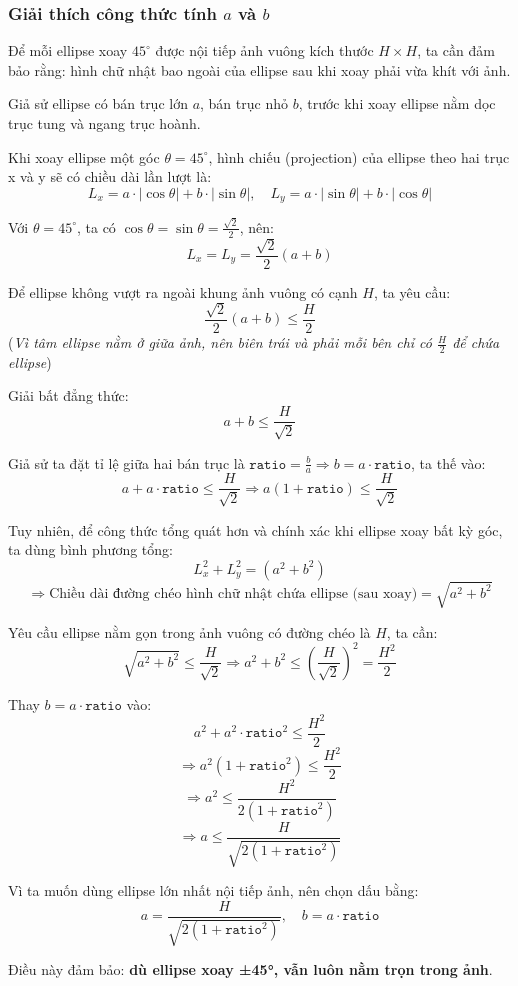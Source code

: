 \subsubsection*{Giải thích công thức tính \( a \) và \( b \)}

Để mỗi ellipse xoay $45^\circ$ được nội tiếp ảnh vuông kích thước $H \times H$, ta cần đảm bảo rằng: hình chữ nhật bao ngoài của ellipse sau khi xoay phải vừa khít với ảnh.

Giả sử ellipse có bán trục lớn \( a \), bán trục nhỏ \( b \), trước khi xoay ellipse nằm dọc trục tung và ngang trục hoành.

Khi xoay ellipse một góc \( \theta = 45^\circ \), hình chiếu (projection) của ellipse theo hai trục x và y sẽ có chiều dài lần lượt là:
\[
  L_x = a \cdot |\cos\theta| + b \cdot |\sin\theta|, \quad
  L_y = a \cdot |\sin\theta| + b \cdot |\cos\theta|
\]

Với \( \theta = 45^\circ \), ta có \( \cos\theta = \sin\theta = \frac{\sqrt{2}}{2} \), nên:
\[
  L_x = L_y = \frac{\sqrt{2}}{2}(a + b)
\]

Để ellipse không vượt ra ngoài khung ảnh vuông có cạnh $H$, ta yêu cầu:
\[
  \frac{\sqrt{2}}{2}(a + b) \leq \frac{H}{2}
\]
(\textit{Vì tâm ellipse nằm ở giữa ảnh, nên biên trái và phải mỗi bên chỉ có $\frac{H}{2}$ để chứa ellipse})

Giải bất đẳng thức:
\[
  a + b \leq \frac{H}{\sqrt{2}}
\]

Giả sử ta đặt tỉ lệ giữa hai bán trục là \( \texttt{ratio} = \frac{b}{a} \Rightarrow b = a \cdot \texttt{ratio} \), ta thế vào:
\[
  a + a \cdot \texttt{ratio} \leq \frac{H}{\sqrt{2}} \Rightarrow a (1 + \texttt{ratio}) \leq \frac{H}{\sqrt{2}}
\]

Tuy nhiên, để công thức tổng quát hơn và chính xác khi ellipse xoay bất kỳ góc, ta dùng bình phương tổng:
\[
  L_x^2 + L_y^2 = (a^2 + b^2)
\]
\[
  \Rightarrow \text{Chiều dài đường chéo hình chữ nhật chứa ellipse (sau xoay)} = \sqrt{a^2 + b^2}
\]

Yêu cầu ellipse nằm gọn trong ảnh vuông có đường chéo là $H$, ta cần:
\[
  \sqrt{a^2 + b^2} \leq \frac{H}{\sqrt{2}}
  \Rightarrow a^2 + b^2 \leq \left( \frac{H}{\sqrt{2}} \right)^2 = \frac{H^2}{2}
\]

Thay \( b = a \cdot \texttt{ratio} \) vào:
\[
  a^2 + a^2 \cdot \texttt{ratio}^2 \leq \frac{H^2}{2}
\]
\[
  \Rightarrow a^2 (1 + \texttt{ratio}^2) \leq \frac{H^2}{2}
\]
\[
  \Rightarrow a^2 \leq \frac{H^2}{2(1 + \texttt{ratio}^2)}
\]
\[
  \Rightarrow a \leq \frac{H}{\sqrt{2(1 + \texttt{ratio}^2)}}
\]

Vì ta muốn dùng ellipse lớn nhất nội tiếp ảnh, nên chọn dấu bằng:
\[
  a = \frac{H}{\sqrt{2(1 + \texttt{ratio}^2)}}, \quad b = a \cdot \texttt{ratio}
\]

Điều này đảm bảo: \textbf{dù ellipse xoay ±45°, vẫn luôn nằm trọn trong ảnh}.



